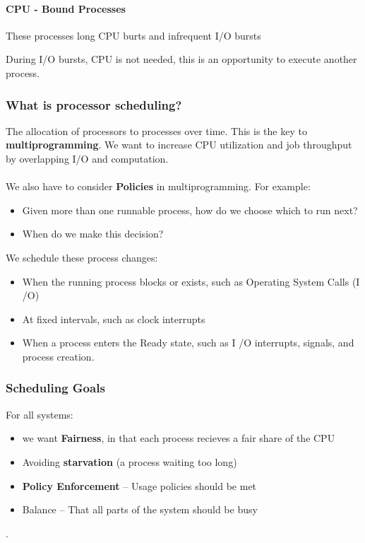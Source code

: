 \documentclass{article}
\begin{document}
\paragraph{CPU - Bound Processes} These processes long CPU burts and infrequent I\slash O bursts

During I\slash O bursts, CPU is not needed, this is an opportunity to execute another process.

\subsubsection{What is processor scheduling?}

The allocation of processors to processes over time. This is the key to \textbf{multiprogramming}. We want to increase CPU utilization and job throughput by overlapping I\slash O and computation.\\
\\
We also have to consider \textbf{Policies} in multiprogramming. For example:
\begin{itemize}
  \item Given more than one runnable process, how do we choose which to run next?
  \item When do we make this decision?
\end{itemize}

We schedule these process changes:
\begin{itemize}
  \item When the running process blocks or exists, such as Operating System Calls (I \slash O)
  \item At fixed intervals, such as clock interrupts
  \item When a process enters the Ready state, such as I \slash O interrupts, signals, and process creation.
\end{itemize}

\subsubsection{Scheduling Goals}

For all systems:
\begin{itemize}
  \item we want \textbf{Fairness}, in that each process recieves a fair share of the CPU
  \item Avoiding \textbf{starvation} (a process waiting too long)
  \item \textbf{Policy Enforcement} -- Usage policies should be met
  \item Balance -- That all parts of the system should be busy
\end{itemize}.
\end{document}
